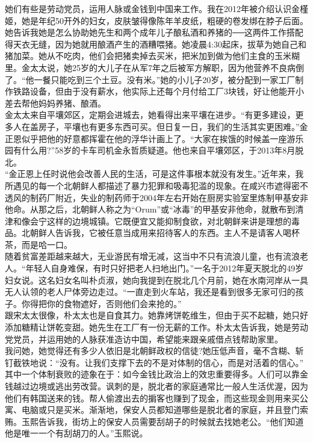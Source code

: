 她们有些是劳动党员，运用人脉或金钱到中国来工作。我在2012年被介绍认识金槿姬，她是年纪50开外的妇女，皮肤皱得像陈年羊皮纸，粗硬的卷发绑在脖子后面。她告诉我她是怎么协助她先生和两个成年儿子酿私酒和养猪的──这两件工作搭配得天衣无缝，因为她就用酿酒产生的酒糟喂猪。她凌晨4:30起床，拔草为她自己和猪加菜。她从不吃肉，他们会把猪卖掉去买米，把米加到做为他们主食的玉米糊里。金太太说，她25岁的大儿子在从军7年之后被军方解职，因为他营养不良病倒了。“他一餐只能吃到三个土豆。没有米。”她的小儿子20岁，被分配到一家工厂制作铁路设备，但由于没有薪水，他实际上还每个月付给工厂3块钱，好让他能开小差去帮他妈妈养猪、酿酒。\\

金太太来自平壤郊区，定期会进城去，她看得出来平壤在进步。“有更多建设，更多人在盖房子，平壤也有更多东西可买。但日复一日，我们的生活其实更困难。”金正恩似乎把他的好意都挥霍在他的浮华计画上了。“大家在挨饿的时候盖一座游乐园有什么用?”58岁的卡车司机金永哲质疑道。他也来自平壤郊区，于2013年8月脱北。\\

“金正恩上任时说他会改善人民的生活，可是这件事根本就没有发生。”近年来，我所遇见的每一个北朝鲜人都描述了暴力犯罪和吸毒犯滥的现象。在咸兴市遮得密不透风的制药厂附近，失业的制药师于2004年左右开始在厨房实验室里炼制甲基安非他命。从那之后，北朝鲜人称之为“Orum”或“冰毒”的甲基安非他命，就散布到清津和像会宁这样的边境城镇。它既便宜又能抑制食欲，对北朝鲜来讲是理想的毒品。北朝鲜人告诉我，它被任意当成用来招待客人的东西。主人不是请客人喝杯茶，而是哈一口。\\

随着贫富差距越来越大，无业游民有增无减，这当中不只有流浪儿童，也有流浪老人。“年轻人自身难保，有时只好把老人扫地出门。”一名于2012年夏天脱北的49岁妇女说。这名妇女名叫朴贞淑，她向我提到在脱北几个月前，她在水南河岸从一具无人认领的老人尸体旁边走过。“一直走到火车站，我还是看到很多无家可归的孩子。你得把你的食物遮好，否则他们会来抢的。”\\

跟宋太太很像，朴太太也是自食其力。她靠烤饼乾维生，但由于买不起糖，她只好添加糖精让饼乾变甜。她先生在工厂有一份无薪的工作。朴太太告诉我，她是劳动党党员，并运用她的人脉获准造访中国，希望能来跟亲戚借点钱帮助家里。\\

我问她，她觉得还有多少人依旧是北朝鲜政权的信徒?她压低声音，毫不含糊、斩钉截铁地说：“没有。让我们支撑下去的不是对体制的信心，而是对活着的信心。”\\

其中一个体制衰败的迹象在于：如今金钱比政治上的效忠重要得多。人们可以靠金钱越过边境或逃出劳改营。讽刺的是，脱北者的家庭通常比一般人生活优渥，因为他们有韩国送来的钱。帮人偷渡出去的掮客也赚到了现金，而这些现金则用来买公寓、电脑或只是买米。渐渐地，保安人员都知道哪些是脱北者的家庭，并且登门索贿。玉熙告诉我，街坊上的保安人员需要刮胡子的时候就去找她老公。“他们知道他是唯一一个有刮胡刀的人。”玉熙说。\\

